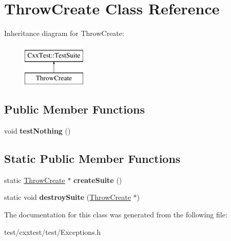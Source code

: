 \hypertarget{classThrowCreate}{\section{Throw\-Create Class Reference}
\label{classThrowCreate}
}
Inheritance diagram for Throw\-Create\-:\begin{figure}[H]
\begin{center}
\leavevmode
\includegraphics[height=2.000000cm]{classThrowCreate}
\end{center}
\end{figure}
\subsection*{Public Member Functions}
\begin{DoxyCompactItemize}
\item 
\hypertarget{classThrowCreate_afeaf412d7430c5660e413e82ab42a378}{void {\bfseries test\-Nothing} ()}\label{classThrowCreate_afeaf412d7430c5660e413e82ab42a378}

\end{DoxyCompactItemize}
\subsection*{Static Public Member Functions}
\begin{DoxyCompactItemize}
\item 
\hypertarget{classThrowCreate_aa4288313a49975d45c0cd53e4c628f3f}{static \hyperlink{classThrowCreate}{Throw\-Create} $\ast$ {\bfseries create\-Suite} ()}\label{classThrowCreate_aa4288313a49975d45c0cd53e4c628f3f}

\item 
\hypertarget{classThrowCreate_a19072b450e89b494ae4272e367afa973}{static void {\bfseries destroy\-Suite} (\hyperlink{classThrowCreate}{Throw\-Create} $\ast$)}\label{classThrowCreate_a19072b450e89b494ae4272e367afa973}

\end{DoxyCompactItemize}


The documentation for this class was generated from the following file\-:\begin{DoxyCompactItemize}
\item 
test/cxxtest/test/Exceptions.\-h\end{DoxyCompactItemize}
